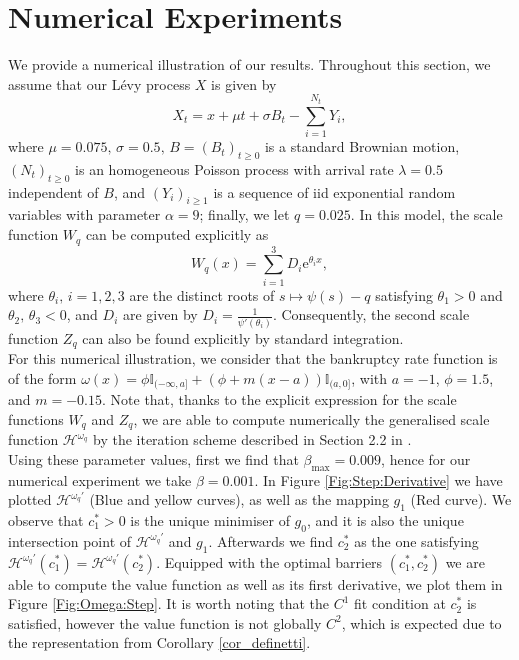 \documentclass[11pt,reqno]{amsart}
\newcommand{\Ind}{\mathbb{I}}
\newcommand{\cH}{\mathcal{H}}
\newcommand{\homega}{\omega_q}
\renewcommand{\geq}{\geqslant}
\begin{document}
\section{Numerical Experiments}\label{Sec:Numerical}
We provide a numerical illustration of our results. Throughout this section, we assume that our L\'evy process $X$ is given by
\[
X_t = x + \mu t + \sigma B_t - \sum_{i = 1}^{N_t} Y_i,
\]
where $\mu = 0.075, \, \sigma = 0.5, \, B=(B_t)_{t\geq 0}$ is a standard Brownian motion, $(N_t)_{t\geq 0}$ is an homogeneous Poisson process with arrival rate $\lambda = 0.5$ independent of $B$, and $(Y_i)_{i \geq 1}$ is a sequence of iid exponential random variables with parameter $\alpha = 9$; finally, we let $q = 0.025$. In this model, the scale function $W_q$ can be computed explicitly as 
\[
W_q(x) = \sum_{i=1}^3 D_i \mathrm{e}^{\theta_i x},
\]
where $\theta_i, \, i = 1,2,3$ are the distinct roots of $s \mapsto \psi(s) - q$ satisfying $\theta_1 > 0$ and $\theta_2,\, \theta_3 < 0$, and  $D_i $ are given by $D_i = \frac{1}{\psi'(\theta_i)}$. Consequently, the second scale function $Z_q$ can also be found explicitly by standard integration.\\
For this numerical illustration, we consider that the bankruptcy rate function is of the form $\omega(x) = \phi \Ind_{(-\infty,a]} + (\phi + m(x-a))\Ind_{(a,0]}$, with $a=-1$, $\phi = 1.5$, and $m = -0.15$. Note that, thanks to the explicit expression for the scale functions $W_q$ and $Z_q$, we are able to compute numerically the generalised scale function $\cH^{\homega}$ by the iteration scheme described in Section 2.2 in \cite{mata-renaud_2024}.\\
Using these parameter values, first we find that $\beta_{\max}= 0.009$, hence for our numerical experiment we take $\beta = 0.001$. In Figure \ref{Fig:Step:Derivative} we have plotted $\cH^{\homega\prime}$ (Blue and yellow curves), as well as the mapping $g_1$ (Red curve). We observe that $c_1^\ast > 0$ is the unique minimiser of $g_0$, and it is also the unique intersection point of $\cH^{\homega\prime}$ and $g_1$. Afterwards we find $c_2^\ast$ as the one satisfying $\cH^{\homega\prime}(c_1^\ast) = \cH^{\homega\prime}(c_2^\ast)$. Equipped with the optimal barriers $(c_1^\ast,c_2^\ast)$ we are able to compute the value function as well as its first derivative, we plot them in Figure \ref{Fig:Omega:Step}. It is worth noting that the $C^1$ fit condition at $c_2^\ast$ is satisfied, however the value function is not globally $C^2$, which is expected due to the representation from Corollary \ref{cor_definetti}. 
\end{document}
